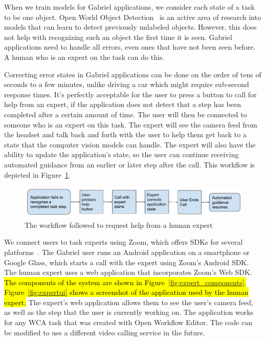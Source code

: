 When we train models for Gabriel applications, we consider each state of a task
to be one object. Open World Object Detection~\cite{joseph2021open} is an active
area of research into models that can learn to detect previously unlabeled
objects. However, this does not help with recognizing such an object the first
time it is seen. Gabriel applications need to handle all errors, even ones that
have not been seen before. A human who is an expert on the task can do this.

Correcting error states in Gabriel applications can be done on the order of tens
of seconds to a few
minutes, unlike driving a car which might require sub-second response times.
It's perfectly acceptable for the user to press a button to call for help from
an expert, if the application does not detect that a step has been completed
after a certain amount of time. The user will then be connected to someone who
is an expert on this task. The expert will
see the camera feed from the headset and talk back and forth with the user to
help them get back to a state that the computer vision models can handle.
The expert will also have the ability to update the application's state, so the
user can continue receiving automated guidance from an earlier or later
step after the call.
This workflow is depicted in Figure~\ref{fig:zoom_workflow}.

\begin{figure}[h]
  \includegraphics[width=\textwidth]{figures/zoom_workflow.pdf}
  \caption{
    The workflow followed to request help from a human expert
  }\label{fig:zoom_workflow}
\end{figure}

We connect users to task experts using Zoom, which offers SDKs for several
platforms~\cite{zoom}. The Gabriel user runs an Android application on a
smartphone or Google Glass, which starts a call with the expert using Zoom's
Android SDK.
The human expert uses a web application that incorporates Zoom's Web SDK.
\hl{
The components of the system are shown in Figure~{\ref{fig:expert_components}}.
Figure~{\ref{fig:expertui}} shows a screenshot of the application used by the
human expert.
}
The expert's web application allows them to see the user's camera feed, as well
as the step that the user is currently working on.
The application works for any WCA task that was created with Open Workflow
Editor.
The code can be modified to use a different video calling service in the future.

